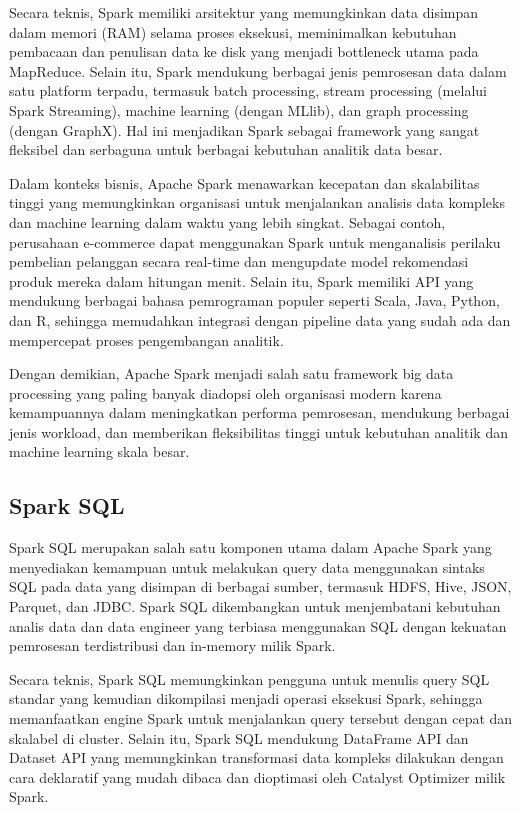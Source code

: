 Secara teknis, Spark memiliki arsitektur yang memungkinkan data disimpan dalam memori (RAM) selama proses eksekusi, meminimalkan kebutuhan pembacaan dan penulisan data ke disk yang menjadi bottleneck utama pada MapReduce. Selain itu, Spark mendukung berbagai jenis pemrosesan data dalam satu platform terpadu, termasuk batch processing, stream processing (melalui Spark Streaming), machine learning (dengan MLlib), dan graph processing (dengan GraphX). Hal ini menjadikan Spark sebagai framework yang sangat fleksibel dan serbaguna untuk berbagai kebutuhan analitik data besar.

Dalam konteks bisnis, Apache Spark menawarkan kecepatan dan skalabilitas tinggi yang memungkinkan organisasi untuk menjalankan analisis data kompleks dan machine learning dalam waktu yang lebih singkat. Sebagai contoh, perusahaan e-commerce dapat menggunakan Spark untuk menganalisis perilaku pembelian pelanggan secara real-time dan mengupdate model rekomendasi produk mereka dalam hitungan menit. Selain itu, Spark memiliki API yang mendukung berbagai bahasa pemrograman populer seperti Scala, Java, Python, dan R, sehingga memudahkan integrasi dengan pipeline data yang sudah ada dan mempercepat proses pengembangan analitik.

Dengan demikian, Apache Spark menjadi salah satu framework big data processing yang paling banyak diadopsi oleh organisasi modern karena kemampuannya dalam meningkatkan performa pemrosesan, mendukung berbagai jenis workload, dan memberikan fleksibilitas tinggi untuk kebutuhan analitik dan machine learning skala besar.


\subsection{Spark SQL}

Spark SQL merupakan salah satu komponen utama dalam Apache Spark yang menyediakan kemampuan untuk melakukan query data menggunakan sintaks SQL pada data yang disimpan di berbagai sumber, termasuk HDFS, Hive, JSON, Parquet, dan JDBC. Spark SQL dikembangkan untuk menjembatani kebutuhan analis data dan data engineer yang terbiasa menggunakan SQL dengan kekuatan pemrosesan terdistribusi dan in-memory milik Spark.

Secara teknis, Spark SQL memungkinkan pengguna untuk menulis query SQL standar yang kemudian dikompilasi menjadi operasi eksekusi Spark, sehingga memanfaatkan engine Spark untuk menjalankan query tersebut dengan cepat dan skalabel di cluster. Selain itu, Spark SQL mendukung DataFrame API dan Dataset API yang memungkinkan transformasi data kompleks dilakukan dengan cara deklaratif yang mudah dibaca dan dioptimasi oleh Catalyst Optimizer milik Spark.

